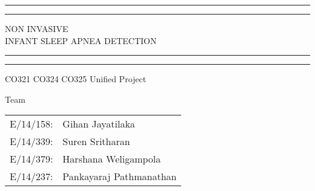 \documentclass{report}
\begin{document}
\begin{titlepage} %

	\centering %
	
	\scshape %
	
	\vspace*{\baselineskip} %
	
	
	\rule{\textwidth}{1.6pt}\vspace*{-\baselineskip}\vspace*{2pt} %
	\rule{\textwidth}{0.4pt} %
	
	\vspace{1.5\baselineskip} %
	
	{\LARGE NON INVASIVE \\\vspace{5.0pt}INFANT SLEEP APNEA DETECTION} %
	
	\vspace{1.5\baselineskip} %
	
	\rule{\textwidth}{0.4pt}\vspace*{-\baselineskip}\vspace{3.2pt} %
	\rule{\textwidth}{1.6pt} %
	
	\vspace{2cm} %
	
	
	CO321 CO324 CO325 Unified Project %
	
	\vspace*{6cm} %
	
	
	Team
	
	\vspace{0.5\baselineskip} %
	
	{\scshape\Large \begin{tabular}{c l}
	     E/14/158: &Gihan Jayatilaka\\E/14/339: &Suren Sritharan\\E/14/379:& Harshana Weligampola\\E/14/237: &Pankayaraj Pathmanathan\\
	\end{tabular} } %
	

\end{titlepage}
\end{document}

